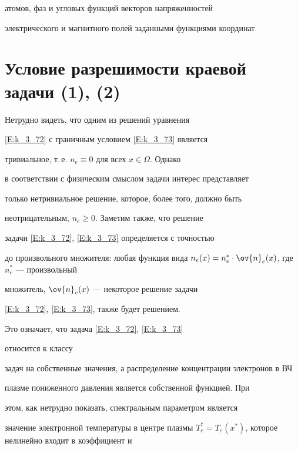 атомов, фаз и угловых функций векторов напряженностей


электрического и магнитного полей заданными функциями координат.








\section{Условие разрешимости краевой задачи (1), (2)}








Нетрудно видеть, что одним из решений уравнения


\eqref{E:k_3_72} с граничным условием \eqref{E:k_3_73} является


тривиальное, т.\,е. $n_{e} \equiv 0$ для всех $x\in \Omega$. Однако


в соответствии с физическим смыслом задачи интерес представляет


только нетривиальное решение, которое, более того, должно быть


неотрицательным, $n_{e} \geqslant 0$. Заметим также, что решение


задачи \eqref{E:k_3_72}, \eqref{E:k_3_73} определяется с точностью


до произвольного множителя: любая функция вида $n_e(x)=


n_e^{\ast}\cdot \ov{n}_e(x)$, где $n_e^{\ast}$ --- произвольный


множитель, $ \ov{n}_e(x)$ --- некоторое решение задачи


\eqref{E:k_3_72}, \eqref{E:k_3_73}, также будет решением.





Это означает, что задача \eqref{E:k_3_72}, \eqref{E:k_3_73}


относится к классу


задач на собственные значения, а распределение концентрации электронов в ВЧ


плазме пониженного давления является собственной функцией. При


этом, как нетрудно показать, спектральным параметром является


значение электронной температуры в центре плазмы $T_e^\ast=T_e


\left(x^\ast\right)$, которое нелинейно входит в коэффициент и


